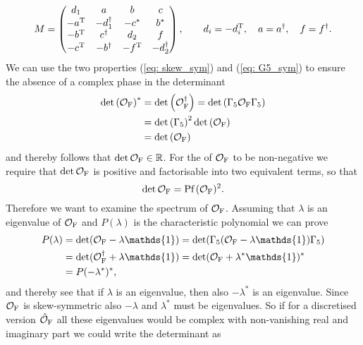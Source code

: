 %
%
\begin{equation}
M=\begin{pmatrix}
d_{1} & a & b & c \\
-a^{\rm T} & -d_{1}^{\dagger} & -c^{*} & b^{*} \\
-b^{\rm T} & c^{\dagger} & d_{2} & f \\
-c^{\rm T} & -b^{\dagger} & -f^{\rm T} & -d_{2}^{\dagger}
\end{pmatrix} ,\qquad d_{i}=-d_{i}^{\rm T},\quad a=a^{\dagger}, \quad f=f^{\dagger}.
\label{eq: G5_herm_mat}
\end{equation}
%
%
We can use the two properties (\ref{eq: skew_sym}) and (\ref{eq: G5_sym}) to ensure the absence of a complex phase in the determinant
%
%
\begin{align}
\det \left(\mathcal{O}_{\rm F}\right)^{*} &= \det  \left( \mathcal{O}_{\rm F}^{\dagger}\right) = \det \left( \Gamma_{5}\mathcal{O}_{\rm F} \Gamma_{5} \right) \notag \\
%
%
&= \det \left(\Gamma_{5}\right)^{2} \det \left(\mathcal{O}_{\rm F}\right) \\
%
%
&= \det \left(\mathcal{O}_{\rm F}\right) \notag
\end{align}
%
%
and thereby follows that $\det\mathcal{O}_{\rm F} \in \mathbb{R}$. For the  of $\mathcal{O}_{\rm F}$ to be non-negative we require that $\det \mathcal{O}_{\rm F}$ is positive and factorisable into two equivalent terms, so that
%
%
\begin{equation}
\det \mathcal{O}_{\rm F} = \text{Pf}\,(\mathcal{O}_{\rm F})^{2}.
\end{equation}
%
%
Therefore we want to examine the spectrum of $\mathcal{O}_{\rm F}$. Assuming that $\lambda$ is an eigenvalue of $\mathcal{O}_{\rm F}$ and $P(\lambda)$ is the characteristic polynomial we can prove
%
%
\begin{align}
P(\lambda) &= \det (\mathcal{O}_{\rm F} -\lambda\mathds{1}) = \det (\Gamma_{5}(\mathcal{O}_{\rm F} -\lambda\mathds{1})\Gamma_{5}) \notag \\
%
&= \det (\mathcal{O}_{\rm F}^{\dagger}+\lambda\mathds{1}) = \det (\mathcal{O}_{\rm F} +\lambda^{*}\mathds{1})^{*} \\
&= P(-\lambda^{*})^{*}, \notag
\end{align}
%
%
and thereby see that if $\lambda$ is an eigenvalue, then also $-\lambda^{*}$ is an eigenvalue. Since $\mathcal{O}_{\rm F}$ is skew-symmetric also $-\lambda$ and $\lambda^{*}$ must be eigenvalues. So if for a discretised version $\hat{\mathcal{O}}_{\rm F}$ all these eigenvalues would be complex with non-vanishing real and imaginary part we could write the determinant as
